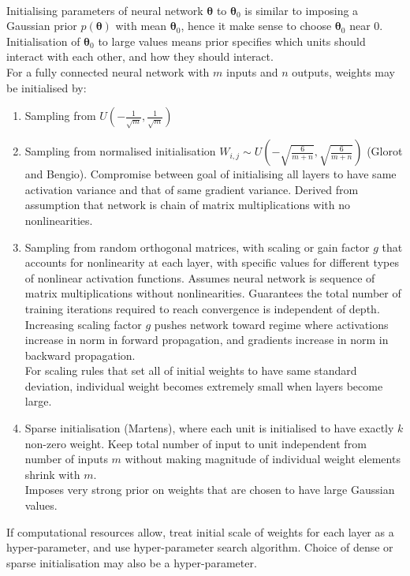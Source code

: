 \begin{remark} \\
Initialising parameters of neural network $\bm{\theta}$ to $\bm{\theta}_0$ is similar to imposing a Gaussian prior $p(\bm{\theta})$ with mean $\bm{\theta}_0$, hence it make sense to choose $\bm{\theta}_0$ near $0$. Initialisation of $\bm{\theta}_0$ to large values means prior specifies which units should interact with each other, and how they should interact.\\
For a fully connected neural network with $m$ inputs and $n$ outputs, weights may be initialised by:
\begin{enumerate}[label=\roman*.]
\setlength{\itemsep}{0pt}
\item Sampling from $U\left(-\frac{1}{\sqrt{m}},  \frac{1}{\sqrt{m}} \right)$
\item Sampling from normalised initialisation $W_{i,j} \sim U \left(-\sqrt{\frac{6}{m+n}},  \sqrt{\frac{6}{m+n}} \right)$ (Glorot and Bengio). Compromise between goal of initialising all layers to have same activation variance and that of same gradient variance. Derived from assumption that network is chain of matrix multiplications with no nonlinearities.
\item Sampling from random orthogonal matrices, with scaling or gain factor $g$ that accounts for nonlinearity at each layer, with specific values for different types of nonlinear activation functions. Assumes neural network is sequence of matrix multiplications without nonlinearities. Guarantees the total number of training iterations required to reach convergence is independent of depth.\\
Increasing scaling factor $g$ pushes network toward regime where activations increase in norm in forward propagation, and gradients increase in norm in backward propagation.\\
For scaling rules that set all of initial weights to have same standard deviation, individual weight becomes extremely small when layers become large.
\item Sparse initialisation (Martens), where each unit is initialised to have exactly $k$ non-zero weight. Keep total number of input to unit independent from number of inputs $m$ without making magnitude of individual weight elements shrink with $m$.\\
Imposes very strong prior on weights that are chosen to have large Gaussian values.
\end{enumerate}
If computational resources allow, treat initial scale of weights for each layer as a hyper-parameter, and use hyper-parameter search algorithm. Choice of dense or sparse initialisation may also be a hyper-parameter.
\end{remark}

